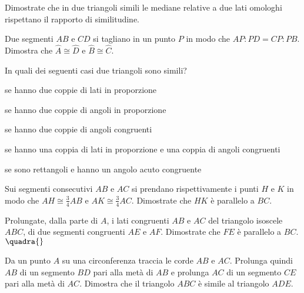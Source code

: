\begin{multicols}{2}
\begin{esercizio}
\label{ese:6.74}
Dimostrate che in due triangoli simili le mediane relative a due lati 
omologhi rispettano il rapporto di similitudine.
\end{esercizio}

\begin{esercizio}
\label{ese:6.75}
Due segmenti $AB$ e $CD$ si tagliano in un punto $P$ in modo che 
$AP:PD=CP:PB$. Dimostra che $\widehat{A}\cong \widehat{D}$ e 
$\widehat{B}\cong \widehat{C}$.
\end{esercizio}

\begin{esercizio}
\label{ese:6.80}
In quali dei seguenti casi due triangoli sono simili?
\begin{enumeratea}
\item se hanno due coppie di lati in 
proporzione\tab\hfill\boxV\quad\boxF
\item se hanno due coppie di angoli in 
proporzione\tab\hfill\boxV\quad\boxF
\item se hanno due coppie di angoli 
congruenti\tab\hfill\boxV\quad\boxF
\item se hanno una coppia di lati in proporzione e una coppia di 
angoli congruenti\tab\hfill\boxV\quad\boxF
\item se sono rettangoli e hanno un angolo acuto 
congruente\hfill\boxV\quad\boxF
\end{enumeratea}
\end{esercizio}

\begin{esercizio}
\label{ese:6.76}
Sui segmenti consecutivi $AB$ e $AC$ si prendano rispettivamente i 
punti $H$ e $K$ in modo che $AH\cong \frac{3}{4}AB$ e $AK\cong 
\frac{3}{4}AC$. Dimostrate che $HK$ è parallelo a $BC$.
\end{esercizio}

\begin{esercizio}
\label{ese:6.77}
Prolungate, dalla parte di $A$, i lati congruenti $AB$ e $AC$ del 
triangolo isoscele $ABC$, di due segmenti congruenti $AE$ e $AF$. 
Dimostrate che $FE$ è parallelo a $BC$.
\hfill$\quadra{}$
\end{esercizio}

\begin{esercizio}
\label{ese:6.78}
Da un punto $A$ su una circonferenza traccia le corde $AB$ e $AC$. 
Prolunga quindi $AB$ di un segmento $BD$ pari alla metà di $AB$ e 
prolunga $AC$ di un segmento $CE$ pari alla metà di $AC$. Dimostra 
che il triangolo $ABC$ è simile al triangolo $ADE$.
\end{esercizio}


\end{multicols}
